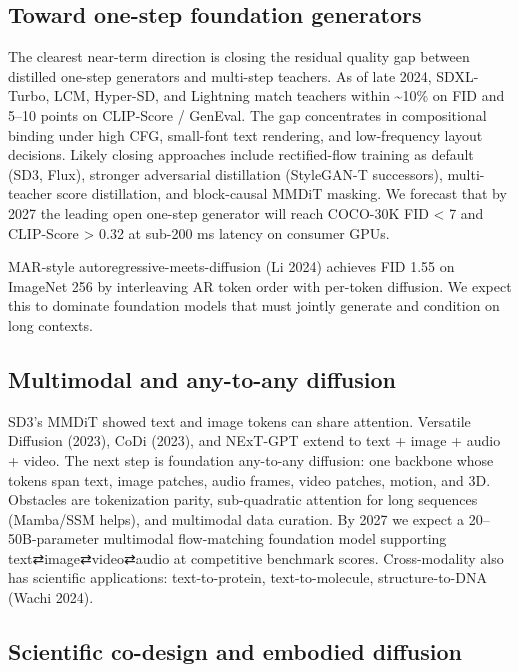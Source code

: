 \subsection{Toward one-step foundation generators}\label{toward-one-step-foundation-generators}

The clearest near-term direction is closing the residual quality gap between distilled one-step generators and multi-step teachers. As of late 2024, SDXL-Turbo, LCM, Hyper-SD, and Lightning match teachers within \textasciitilde10\% on FID and 5--10 points on CLIP-Score / GenEval. The gap concentrates in compositional binding under high CFG, small-font text rendering, and low-frequency layout decisions. Likely closing approaches include rectified-flow training as default (SD3, Flux), stronger adversarial distillation (StyleGAN-T successors), multi-teacher score distillation, and block-causal MMDiT masking. We forecast that by 2027 the leading open one-step generator will reach COCO-30K FID \textless{} 7 and CLIP-Score \textgreater{} 0.32 at sub-200 ms latency on consumer GPUs.

MAR-style autoregressive-meets-diffusion (Li 2024) achieves FID 1.55 on ImageNet 256 by interleaving AR token order with per-token diffusion. We expect this to dominate foundation models that must jointly generate and condition on long contexts.

\subsection{Multimodal and any-to-any diffusion}\label{multimodal-and-any-to-any-diffusion}

SD3's MMDiT showed text and image tokens can share attention. Versatile Diffusion (2023), CoDi (2023), and NExT-GPT extend to text + image + audio + video. The next step is foundation any-to-any diffusion: one backbone whose tokens span text, image patches, audio frames, video patches, motion, and 3D. Obstacles are tokenization parity, sub-quadratic attention for long sequences (Mamba/SSM helps), and multimodal data curation. By 2027 we expect a 20--50B-parameter multimodal flow-matching foundation model supporting text⇄image⇄video⇄audio at competitive benchmark scores. Cross-modality also has scientific applications: text-to-protein, text-to-molecule, structure-to-DNA (Wachi 2024).

\subsection{Scientific co-design and embodied diffusion}\label{scientific-co-design-and-embodied-diffusion}

